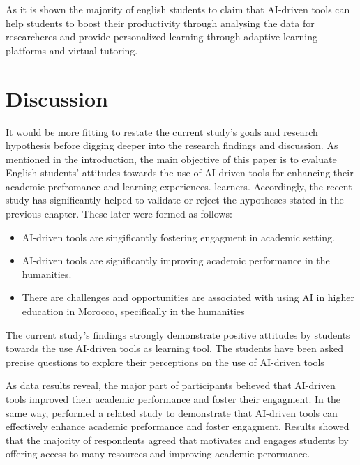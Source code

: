 As it is shown the majority of english students to claim that AI-driven tools can
help students to boost their productivity through analysing the data for researcheres
and provide personalized learning through adaptive learning platforms and virtual tutoring.

\section{Discussion}
It would be more fitting to restate the current study’s goals and research hypothesis
before digging deeper into the research findings and discussion. As mentioned in the
introduction, the main objective of this paper is to evaluate English students’ attitudes towards the
use of AI-driven tools for enhancing their academic prefromance and learning experiences.
learners. Accordingly, the recent study has significantly helped
to validate or reject the hypotheses stated in the previous chapter.
These later were formed as follows:
\begin{itemize}
	\item AI-driven tools are singificantly fostering engagment in academic setting.
	\item AI-driven tools are significantly improving academic performance in the humanities.
	\item There are challenges and opportunities are associated with using AI in higher education
	      in Morocco, specifically in the humanities
\end{itemize}
The current study’s findings strongly demonstrate positive attitudes by students towards
the use AI-driven tools as learning tool. The students have been asked precise questions
to explore their perceptions on the use of AI-driven tools

As data results reveal, the major part of participants believed that AI-driven tools
improved their academic performance and foster their engagment. In the same way, 
\citep{mohammed_exploring_2023} performed a related study
to demonstrate that AI-driven tools can effectively enhance 
academic preformance and foster engagment. Results showed
that the majority of respondents agreed that  
motivates and engages students by offering access to 
many resources and improving academic perormance. 

